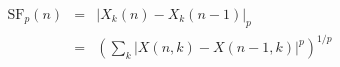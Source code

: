 \documentclass{article}
\begin{document}
 
\begin{eqnarray*}
\mbox{SF}_p(n) & = & \left| X_k(n) - X_k(n-1) \right|_p \\
   & =  & \left( \sum_k |X(n,k) - X(n-1,k)|^p \right)^{1/p}
\end{eqnarray*}
 \newpage 
\end{document}
